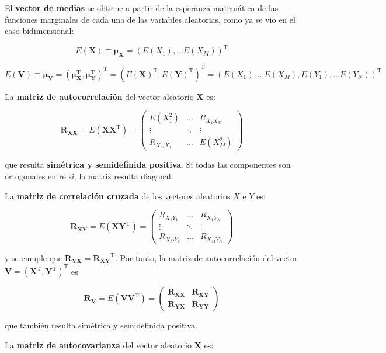\documentclass[11pt]{article}
\begin{document}
El \textbf{vector de medias} se obtiene a partir de la esperanza
matemática de las funciones marginales de cada una de las variables
aleatorias, como ya se vio en el caso bidimensional:

\[
E(\mathbf{X})\equiv \boldsymbol{\mu}_{\mathbf{X}} = \left(E(X_1), \ldots E(X_M) \right)^\mathrm{T}
\]

\[
E(\mathbf{V})\equiv \boldsymbol{\mu}_{\mathbf{V}} 
= \left(\boldsymbol{\mu}_\mathbf{X}^\mathrm{T} , \boldsymbol{\mu}_\mathbf{Y}^\mathrm{T} \right)^\mathrm{T}
= \left(E(\mathbf{X})^\mathrm{T}, E(\mathbf{Y})^\mathrm{T} \right)^\mathrm{T} =
\left(E(X_1), \ldots E(X_M), E(Y_1), \ldots E(Y_N)\right)^\mathrm{T}
\]

La \textbf{matriz de autocorrelación} del vector aleatorio
\(\mathbf{X}\) es:

\[
\mathbf{R_{XX}} = E(\mathbf{XX}^\mathrm{T}) = 
\begin{pmatrix}
E(X_1^2) & \ldots & R_{X_1X_M}\\
\vdots & \ddots & \vdots\\
R_{X_MX_1} & \ldots & E(X_M^2)
\end{pmatrix}
\]

que resulta \textbf{simétrica y semidefinida positiva}. Si todas las
componentes son ortogonales entre sí, la matriz resulta diagonal.

    La \textbf{matriz de correlación cruzada} de los vectores aleatorios
\(X\) e \(Y\) es:

\[
\mathbf{R_{XY}} = E(\mathbf{XY}^\mathrm{T}) = 
\begin{pmatrix}
R_{X_1Y_1} & \ldots & R_{X_1Y_N}\\
\vdots & \ddots & \vdots\\
R_{X_MY_1} & \ldots & R_{X_MY_N}
\end{pmatrix}
\]

y se cumple que \(\mathbf{R_{YX}} = \mathbf{R_{XY}}^\mathrm{T}\). Por
tanto, la matriz de autocorrelación del vector
\(\mathbf V = (\mathbf{X}^\mathrm{T} , \mathbf{Y}^\mathrm{T})^\mathrm{T}\)
es

\[
\mathbf{R_{V}} = E(\mathbf{VV}^\mathrm{T}) = 
\begin{pmatrix}
\mathbf{R_{XX}} & \mathbf{R_{XY}}\\
\mathbf{R_{YX}} & \mathbf{R_{YY}}
\end{pmatrix}
\]

que también resulta simétrica y semidefinida positiva.

    La \textbf{matriz de autocovarianza} del vector aleatorio \(\mathbf{X}\)
es:
\end{document}
